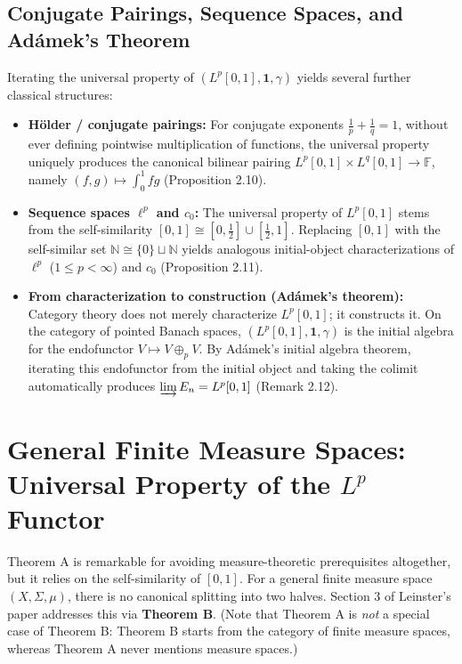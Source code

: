 \subsection{Conjugate Pairings, Sequence Spaces, and Adámek's Theorem}

Iterating the universal property of $(L^p[0,1], \mathbf{1}, \gamma)$ yields several further classical structures:
\begin{itemize}
    \item \textbf{Hölder / conjugate pairings:} For conjugate exponents $\frac{1}{p} + \frac{1}{q} = 1$, without ever defining pointwise multiplication of functions, the universal property uniquely produces the canonical bilinear pairing $L^p[0,1] \times L^q[0,1] \to \mathbb{F}$, namely $(f, g) \mapsto \int_0^1 fg$ (Proposition 2.10).
    \item \textbf{Sequence spaces $\ell^p$ and $c_0$:} The universal property of $L^p[0,1]$ stems from the self-similarity $[0,1] \cong [0, \frac{1}{2}] \cup [\frac{1}{2}, 1]$. Replacing $[0,1]$ with the self-similar set $\mathbb{N} \cong \{0\} \sqcup \mathbb{N}$ yields analogous initial-object characterizations of $\ell^p$ ($1 \le p < \infty$) and $c_0$ (Proposition 2.11).
    \item \textbf{From characterization to construction (Adámek's theorem):} Category theory does not merely characterize $L^p[0,1]$; it constructs it. On the category of pointed Banach spaces, $(L^p[0,1], \mathbf{1}, \gamma)$ is the initial algebra for the endofunctor $V \mapsto V \oplus_p V$. By Adámek's initial algebra theorem, iterating this endofunctor from the initial object and taking the colimit automatically produces $\varinjlim E_n = L^p[0,1]$ (Remark 2.12).
\end{itemize}

\section{General Finite Measure Spaces: Universal Property of the $L^p$ Functor}

Theorem A is remarkable for avoiding measure-theoretic prerequisites altogether, but it relies on the self-similarity of $[0,1]$. For a general finite measure space $(X, \Sigma, \mu)$, there is no canonical splitting into two halves. Section 3 of Leinster's paper addresses this via \textbf{Theorem B}. (Note that Theorem A is \emph{not} a special case of Theorem B: Theorem B starts from the category of finite measure spaces, whereas Theorem A never mentions measure spaces.)

